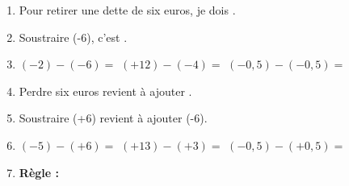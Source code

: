 \documentclass[activite]{thedocument}
\begin{document}
    \begin{enumerate}
        \item Pour retirer une dette de six euros, je dois \doted{150pt}.\vskip50pt
        \item Soustraire (-6), c'est \doted{100pt}.
        \item $(-2)-(-6)=$\vskip20pt
        $(+12)-(-4)=$\vskip20pt
        $(-0,5)-(-0,5)=$\vskip50pt
        \item Perdre six euros revient à ajouter \doted{100pt}.\vskip50pt
        \item Soustraire (+6) revient à ajouter (-6).
        \item $(-5)-(+6)=$\vskip20pt
        $(+13)-(+3)=$\vskip20pt
        $(-0,5)-(+0,5)=$\vskip50pt
        \item {\bfseries Règle :}
    \end{enumerate}
\end{document}
